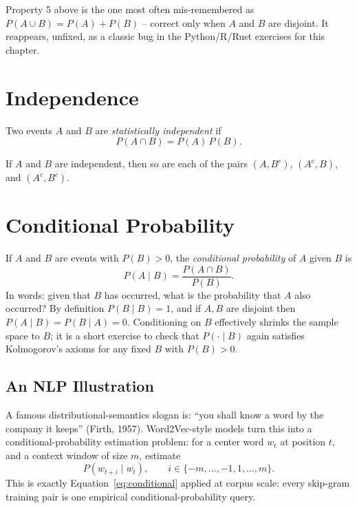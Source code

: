 \documentclass[11pt]{article}
\begin{document}
Property 5 above is the one most often mis-remembered as
$P(A \cup B) = P(A) + P(B)$ -- correct only when $A$ and $B$ are disjoint.
It reappears, unfixed, as a classic bug in the Python/R/Rust exercises for
this chapter.

\section{Independence}

\begin{definition}
Two events $A$ and $B$ are \emph{statistically independent} if
\[
  P(A \cap B) = P(A) \, P(B).
\]
\end{definition}

\begin{theorem}
If $A$ and $B$ are independent, then so are each of the pairs
$(A, B^c)$, $(A^c, B)$, and $(A^c, B^c)$.
\end{theorem}

\section{Conditional Probability}

\begin{definition}
If $A$ and $B$ are events with $P(B) > 0$, the \emph{conditional probability}
of $A$ given $B$ is
\begin{equation}
  P(A \mid B) = \frac{P(A \cap B)}{P(B)}.
  \label{eq:conditional}
\end{equation}
In words: given that $B$ has occurred, what is the probability that $A$ also
occurred? By definition $P(B \mid B) = 1$, and if $A, B$ are disjoint then
$P(A \mid B) = P(B \mid A) = 0$. Conditioning on $B$ effectively shrinks the
sample space to $B$; it is a short exercise to check that $P(\cdot \mid B)$
again satisfies Kolmogorov's axioms for any fixed $B$ with $P(B) > 0$.
\end{definition}

\subsection{An NLP Illustration}
A famous distributional-semantics slogan is: ``you shall know a word by the
company it keeps'' (Firth, 1957). Word2Vec-style models turn this into a
conditional-probability estimation problem: for a center word $w_t$ at
position $t$, and a context window of size $m$, estimate
\[
  P(w_{t+i} \mid w_t), \qquad i \in \{-m, \dots, -1, 1, \dots, m\}.
\]
This is exactly Equation~\eqref{eq:conditional} applied at corpus scale: every
skip-gram training pair is one empirical conditional-probability query.
\end{document}
